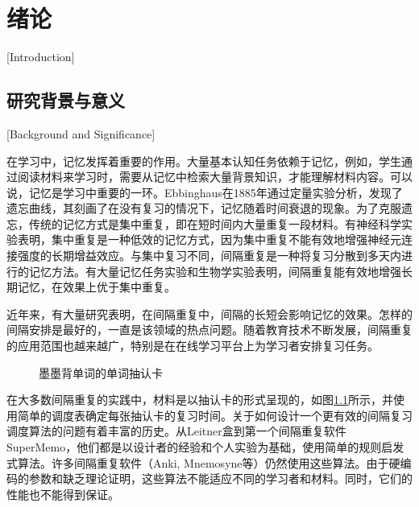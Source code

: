 
\chapter{绪论}[Introduction]

\section{研究背景与意义}[Background and Significance]

在学习中，记忆发挥着重要的作用。大量基本认知任务依赖于记忆，例如，学生通过阅读材料来学习时，需要从记忆中检索大量背景知识，才能理解材料内容\cite{reisbergCognitionExploringScience2019}。可以说，记忆是学习中重要的一环。Ebbinghaus在1885年通过定量实验分析，发现了遗忘曲线，其刻画了在没有复习的情况下，记忆随着时间衰退的现象\cite{ebbinghausMemoryContributionExperimental1913}。为了克服遗忘，传统的记忆方式是集中重复，即在短时间内大量重复一段材料。有神经科学实验表明，集中重复是一种低效的记忆方式，因为集中重复不能有效地增强神经元连接强度的长期增益效应\cite{kramarSynapticEvidenceEfficacy2012}。与集中复习不同，间隔重复是一种将复习分散到多天内进行的记忆方法。有大量记忆任务实验\cite{cepedaDistributedPracticeVerbal2006}和生物学实验\cite{smolenRightTimeLearn2016}表明，间隔重复能有效地增强长期记忆，在效果上优于集中重复。

近年来，有大量研究表明，在间隔重复中，间隔的长短会影响记忆的效果\cite{cepedaSpacingEffectsLearning2008,delaneySpacingTestingEffects2010}。怎样的间隔安排是最好的，一直是该领域的热点问题。随着教育技术不断发展，间隔重复的应用范围也越来越广，特别是在在线学习平台上为学习者安排复习任务。

\begin{figure}[htbp]
    \setlength{\subfigcapskip}{-1bp}
    \centering
    \begin{minipage}{\textwidth}
    \centering
    \subfigure{\label{fig:flashcard:front}}\addtocounter{subfigure}{-2}
    \hspace{2em}
    \subfigure{\label{fig:flashcard:back}}\addtocounter{subfigure}{-2}
    \end{minipage}
    \caption{墨墨背单词的单词抽认卡}
    \label{fig:flashcard}
\end{figure}

在大多数间隔重复的实践中，材料是以抽认卡的形式呈现的，如图\ref{fig:flashcard}所示，并使用简单的调度表确定每张抽认卡的复习时间。关于如何设计一个更有效的间隔复习调度算法的问题有着丰富的历史。从Leitner盒到第一个间隔重复软件SuperMemo，他们都是以设计者的经验和个人实验为基础，使用简单的规则启发式算法。许多间隔重复软件（Anki, Mnemosyne等）仍然使用这些算法。由于硬编码的参数和缺乏理论证明，这些算法不能适应不同的学习者和材料。同时，它们的性能也不能得到保证。

